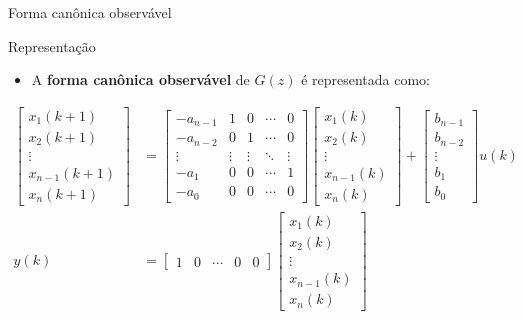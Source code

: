 \begin{frame}{Forma canônica observável}
\begin{block}{Representação}
\begin{itemize}
    \item A \textbf{forma canônica observável} de $G(z)$ é representada como:
\end{itemize}

\begin{align*}
    \begin{bmatrix} x_1(k+1) \\ x_2(k+1) \\ \vdots \\  x_{n-1}(k+1) \\ x_n(k+1) \end{bmatrix}
    &=
    \begin{bmatrix}
    -a_{n-1} & 1 & 0 & \cdots & 0 \\
    -a_{n-2} & 0 & 1 & \cdots & 0 \\
     \vdots & \vdots & \vdots & \ddots & \vdots \\
    -a_1 & 0 & 0 & \cdots & 1 \\
    -a_0 & 0 & 0 & \cdots & 0
    \end{bmatrix}
    \begin{bmatrix} x_1(k) \\ x_2(k) \\ \vdots \\  x_{n-1}(k) \\ x_n(k) \end{bmatrix}
    +
    \begin{bmatrix}
    b_{n-1} \\ b_{n-2} \\ \vdots \\ b_1 \\ b_0
    \end{bmatrix}
    u(k) \\
    y(k)
    &=
    \begin{bmatrix}
    1 & 0 & \cdots & 0 & 0 
    \end{bmatrix}
    \begin{bmatrix}
    x_1(k) \\ x_2(k) \\ \vdots \\  x_{n-1}(k) \\ x_n(k)
    \end{bmatrix}
\end{align*}
\end{block}
\end{frame}

